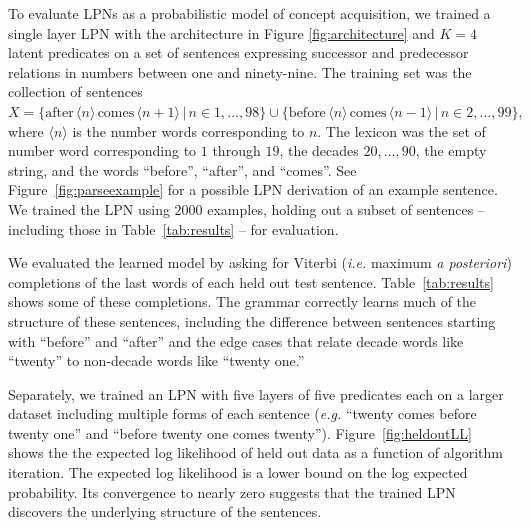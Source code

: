 \documentclass{article} %
\begin{document}
To evaluate LPNs as a probabilistic model of concept acquisition, we
trained a single layer LPN with the architecture in Figure
\ref{fig:architecture} and $K = 4$ latent predicates on a set of
sentences expressing successor and predecessor relations in numbers
between one and ninety-nine. The training set was the collection of
sentences $X = \{\text{after}\, \langle n \rangle \, \text{comes} \,
\langle n+1 \rangle \,|\, n \in 1,\dots,98\} \cup \{\text{before}
\,\langle n \rangle \, \text{comes} \, \langle n-1 \rangle \,|\, n \in
2,\dots,99\},$ where $\langle n \rangle$ is the number words
corresponding to $n$. The lexicon was the set of number word
corresponding to $1$ through $19$, the decades $20, \dots, 90$, the
empty string, and the words ``before'', ``after'', and ``comes''. See
Figure~\ref{fig:parseexample} for a possible LPN derivation of an
example sentence.
We trained the LPN using $2000$ examples, holding out a subset of
sentences -- including those in Table~\ref{tab:results} -- for evaluation.


We evaluated the learned model by asking for Viterbi ({\it i.e.}
maximum {\it a posteriori}) completions of the last words of each held
out test sentence. Table~\ref{tab:results} shows some of these
completions. The grammar correctly learns much of the structure of
these sentences, including the difference between sentences starting
with ``before'' and ``after'' and the edge cases that relate decade
words like ``twenty'' to non-decade words like ``twenty one.''

Separately, we trained an LPN with five layers of five predicates each
on a larger dataset including multiple forms of each sentence
(\textit{e.g.} ``twenty comes before twenty one'' and ``before twenty one comes
twenty''). Figure~\ref{fig:heldoutLL} shows the the expected log
likelihood of held out data as a function of algorithm iteration. The
expected log likelihood is a lower bound on the log expected
probability. Its convergence to nearly zero suggests that the trained
LPN discovers the underlying structure of the sentences.
\end{document}
